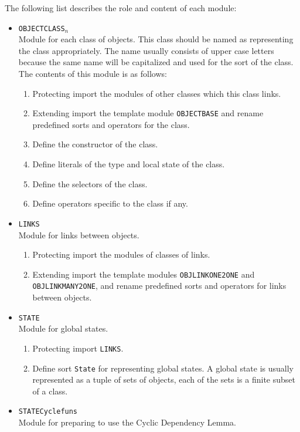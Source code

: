 \documentclass[12pt]{report}
\begin{document}
The following list describes the role and content of each module:
\begin{itemize}
\item {\tt OBJECTCLASS}\Large$_n$\normalsize\\
  Module for each class of objects. This class should be named as
  representing the class appropriately. The name usually consists
  of upper case letters because the same name will be capitalized
  and used for the sort of the class. The contents of this module
  is as follows:
  \begin{enumerate}
  \item Protecting import the modules of other classes which this
    class links.
  \item Extending import the template module {\tt OBJECTBASE} and
    rename predefined sorts and operators for the class.
  \item Define the constructor of the class.
  \item Define literals of the type and local state of the class.
  \item Define the selectors of the class.
  \item Define operators specific to the class if any.
  \end{enumerate}
\item {\tt LINKS}\\
  Module for links between objects. 
  \begin{enumerate}
  \item Protecting import the modules of classes of links.
  \item Extending import the template modules {\tt OBJLINKONE2ONE} and
    {\tt OBJLINKMANY2ONE}, and rename predefined sorts and operators
    for links between objects.
  \end{enumerate}
\item {\tt STATE}\\
  Module for global states.
  \begin{enumerate}
  \item Protecting import {\tt LINKS}.
  \item Define sort {\tt State} for representing global states.  A
    global state is usually represented as a tuple of sets of objects,
    each of the sets is a finite subset of a class.
  \end{enumerate}
\item {\tt STATECyclefuns}\\
  Module for preparing to use the Cyclic Dependency Lemma.
  \begin{enumerate}

\end{enumerate}
\end{itemize}
\end{document}
